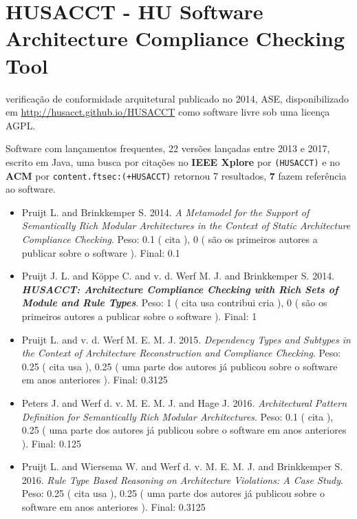 \section{HUSACCT - HU Software Architecture Compliance Checking Tool}

verificação de conformidade arquitetural
publicado no 2014, ASE,
disponibilizado em \url{http://husacct.github.io/HUSACCT}
como software livre
sob uma licença AGPL.

Software com lançamentos frequentes,
22 versões lançadas
entre 2013 e 2017,
escrito em Java,
uma busca por citações no {\bf IEEE Xplore} por
\texttt{(HUSACCT)}
e no {\bf ACM} por
\texttt{content.ftsec:(+HUSACCT)}
retornou
7 resultados,
{\bf 7} fazem referência ao software.

\begin{itemize}
\item Pruijt L. and Brinkkemper S.
      2014.
        \textit{ A Metamodel for the Support of Semantically Rich Modular Architectures in the Context of Static Architecture Compliance Checking}.
      Peso:
      0.1 (
          cita
      ),
      0 (
são os primeiros autores a publicar sobre o software
      ).
      Final:
      0.1

\item Pruijt J. L. and K\"{o}ppe C. and v. d. Werf M. J. and Brinkkemper S.
      2014.
        \textbf{\textit{ HUSACCT: Architecture Compliance Checking with Rich Sets of Module and Rule Types}}.
      Peso:
      1 (
          cita
          usa
          contribui
          cria
      ),
      0 (
são os primeiros autores a publicar sobre o software
      ).
      Final:
      1

\item Pruijt L. and v. d. Werf M. E. M. J.
      2015.
        \textit{ Dependency Types and Subtypes in the Context of Architecture Reconstruction and Compliance Checking}.
      Peso:
      0.25 (
          cita
          usa
      ),
      0.25 (
uma parte dos autores já publicou sobre o software em anos anteriores
      ).
      Final:
      0.3125

\item Peters J. and Werf d. v. M. E. M. J. and Hage J.
      2016.
        \textit{ Architectural Pattern Definition for Semantically Rich Modular Architectures}.
      Peso:
      0.1 (
          cita
      ),
      0.25 (
uma parte dos autores já publicou sobre o software em anos anteriores
      ).
      Final:
      0.125

\item Pruijt L. and Wiersema W. and Werf d. v. M. E. M. J. and Brinkkemper S.
      2016.
        \textit{ Rule Type Based Reasoning on Architecture Violations: A Case Study}.
      Peso:
      0.25 (
          cita
          usa
      ),
      0.25 (
uma parte dos autores já publicou sobre o software em anos anteriores
      ).
      Final:
      0.3125


\end{itemize}
